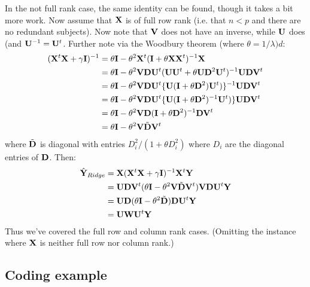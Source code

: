 In the not full rank case, the same identity can be found, though it takes a bit more work. Now assume
that $\mathbf{X}$ is of full row rank (i.e. that $n < p$ and there are no redundant subjects). Now note that
$\mathbf{V}$ does not have an inverse, while $\mathbf{U}$ does (and $\mathbf{U}^{-1} = \mathbf{U}^t$. Further note via
the Woodbury theorem (where $\theta = 1/\lambda)d$:
\begin{align*}
(\mathbf{X}^t \mathbf{X} + \gamma \mathbf{I})^{-1} & = 
\theta \mathbf{I} - \theta^2 \mathbf{X}^t (\mathbf{I} + \theta \mathbf{X} \mathbf{X}^t)^{-1} \mathbf{X} \\
& = \theta \mathbf{I} - \theta^2 \mathbf{V} \mathbf{D} \mathbf{U}^t  (\mathbf{U} \mathbf{U}^t + \theta \mathbf{U} \mathbf{D}^2 \mathbf{U}^t)^{-1} \mathbf{U} \mathbf{D} \mathbf{V}^t \\
& = \theta \mathbf{I} - \theta^2 \mathbf{V} \mathbf{D} \mathbf{U}^t \{\mathbf{U}(\mathbf{I} + \theta \mathbf{D}^2) \mathbf{U}^t)\}^{-1} \mathbf{U} \mathbf{D} \mathbf{V}^t \\
& = \theta \mathbf{I} - \theta^2 \mathbf{V} \mathbf{D} \mathbf{U}^t \{\mathbf{U}(\mathbf{I} + \theta \mathbf{D}^2)^{-1} \mathbf{U}^t)\} \mathbf{U} \mathbf{D} \mathbf{V}^t \\ 
& = \theta \mathbf{I} - \theta^2 \mathbf{V} \mathbf{D} (\mathbf{I} + \theta \mathbf{D}^2)^{-1} \mathbf{D} \mathbf{V}^t \\
& = \theta \mathbf{I} - \theta^2 \mathbf{V} \tilde {\mathbf{D}} \mathbf{V}^t 
\end{align*}
where $\tilde {\mathbf{D}}$ is diagonal with entries $D_i^2 / (1 + \theta D_i^2)$ where $D_i$ are the 
diagonal entries of $\mathbf{D}$. Then:
\begin{align*}
\hat {\mathbf{Y}}_{Ridge} 
& = \mathbf{X} (\mathbf{X}^t \mathbf{X} + \gamma \mathbf{I})^{-1} \mathbf{X}^t \mathbf{Y}  \\
& = \mathbf{U} \mathbf{D} \mathbf{V}^t (\theta \mathbf{I} - \theta^2 \mathbf{V} \tilde {\mathbf{D}} \mathbf{V}^t) \mathbf{V} \mathbf{D} \mathbf{U}^t \mathbf{Y} \\
& = \mathbf{U} \mathbf{D} (\theta \mathbf{I} - \theta^2 \tilde {\mathbf{D}})\mathbf{D} \mathbf{U}^t \mathbf{Y} \\
& = \mathbf{U} \mathbf{W} \mathbf{U}^t \mathbf{Y}
\end{align*}
Thus we've covered the full row and column rank cases. (Omitting the instance where $\mathbf{X}$ is neither
full row nor column rank.)


\subsection{Coding example}



